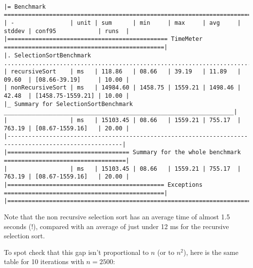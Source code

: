 \documentclass{article}
\begin{document}
\begingroup
\fontsize{8pt}{8pt}\selectfont
\begin{verbatim}

|= Benchmark ===========================================================================================|
| -                | unit | sum      | min     | max     | avg     | stddev | conf95            | runs  |
|============================================== TimeMeter ==============================================|
|. SelectionSortBenchmark ..............................................................................|
| recursiveSort    | ms   | 118.86   | 08.66   | 39.19   | 11.89   | 09.60  | [08.66-39.19]     | 10.00 |
| nonRecursiveSort | ms   | 14984.60 | 1458.75 | 1559.21 | 1498.46 | 42.48  | [1458.75-1559.21] | 10.00 |
|_ Summary for SelectionSortBenchmark __________________________________________________________________|
|                  | ms   | 15103.45 | 08.66   | 1559.21 | 755.17  | 763.19 | [08.67-1559.16]   | 20.00 |
|-------------------------------------------------------------------------------------------------------|
|=================================== Summary for the whole benchmark ===================================|
|                  | ms   | 15103.45 | 08.66   | 1559.21 | 755.17  | 763.19 | [08.67-1559.16]   | 20.00 |
|============================================= Exceptions ==============================================|
|=======================================================================================================|

\end{verbatim}
\endgroup


Note that the non recursive selection sort has an average time of almost 1.5 seconds (!), compared with an average of just under 12 ms for the recursive selection sort.

To spot check that this gap isn't proportional to $n$ (or to $n^2$), here is the same table for 10 iterations with $n=2500$:
\end{document}

